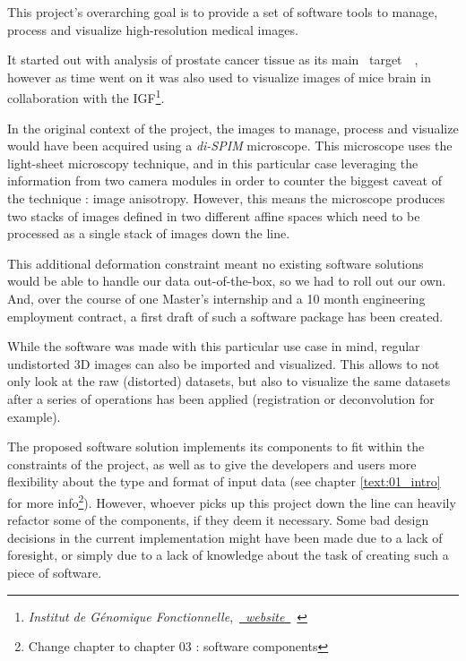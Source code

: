 {
	This project's overarching goal is to provide a set of software tools to manage, process and visualize high-resolution medical images.\par
	It started out with analysis of prostate cancer tissue as its main \guillemotleft~target~\guillemotright~, however as time went on it was also used to visualize images of mice brain in collaboration with the IGF\footnote{\textit{Institut de Génomique Fonctionnelle},~\href{https://www.igf.cnrs.fr/index.php/en/}{~\underline{\textit{website}}~}~}.

	\vspace{\baselineskip}

	In the original context of the project, the images to manage, process and visualize would have been acquired using a \textit{di-SPIM} microscope. This microscope uses the light-sheet microscopy technique, and in this particular case leveraging the information from two camera modules in order to counter the biggest caveat of the technique : image anisotropy. However, this means the microscope produces two stacks of images defined in two different affine spaces which need to be processed as a single stack of images down the line.\par

	\vspace{\baselineskip}

	This additional deformation constraint meant no existing software solutions would be able to handle our data out-of-the-box, so we had to roll out our own. And, over the course of one Master's internship and a 10 month engineering employment contract, a first draft of such a software package has been created.\par

	\vspace{\baselineskip}

	While the software was made with this particular use case in mind, regular undistorted 3D images can also be imported and visualized. This allows to not only look at the raw (distorted) datasets, but also to visualize the same datasets after a series of operations has been applied (registration or deconvolution for example).

	\vspace{\baselineskip}

	The proposed software solution implements its components to fit within the constraints of the project, as well as to give the developers and users more flexibility about the type and format of input data (see chapter \ref{text:01_intro} for more info\footnote{Change chapter to chapter 03 : software components}). However, whoever picks up this project down the line can heavily refactor some of the components, if they deem it necessary. Some bad design decisions in the current implementation might have been made due to a lack of foresight, or simply due to a lack of knowledge about the task of creating such a piece of software.
}

